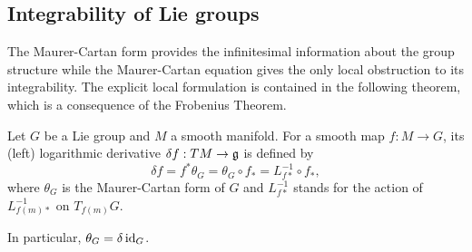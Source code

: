 \subsection{Integrability of Lie groups}\label{sec: existence of homs}

The Maurer-Cartan form provides the infinitesimal information about the group structure while the Maurer-Cartan equation gives the only local obstruction to its integrability. The explicit local formulation is contained in the following theorem, which is a consequence of the Frobenius Theorem.

\begin{defn}
    Let $G$ be a Lie group and $M$ a smooth manifold. For a smooth map $f:M\to G$, its (left) logarithmic derivative $\delta f:TM\to \mathfrak{g}$ is defined by
    \[\delta f=f^\ast\theta_G=\theta_G\circ f_\ast=L_{f\ast}^{-1}\circ f_\ast,\]
    where $\theta_G$ is the Maurer-Cartan form of $G$ and $L_{f\ast}^{-1}$ stands for the action of $L_{f(m)\ast}^{-1}$ on $T_{f(m)}G$.
    
    In particular, $\theta_G=\delta\operatorname{id}_G$.
\end{defn}


